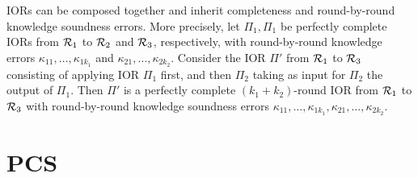 \documentclass[11pt,letterpaper,usenames,dvipsnames]{article}
\begin{document}
\begin{remark}\label{r:ior_compositoin}
 IORs can be composed together and inherit completeness and round-by-round knowledge soundness errors. More precisely, let $\Pi_1,\Pi_1$ be perfectly complete IORs from $\mathcal{R}_1$ to $\mathcal{R}_2$  and $\mathcal{R}_3$, respectively, with round-by-round knowledge errors $\kappa_{11},\ldots, \kappa_{1k_1}$ and $\kappa_{21}, \ldots, \kappa_{2k_2}$. Consider  the IOR $\Pi'$ from $\mathcal{R}_1$ to $\mathcal{R}_3$ consisting of applying IOR $\Pi_1$ first, and then $\Pi_2$ taking as input for $\Pi_2$ the output of $\Pi_1$.   Then $\Pi'$ is a perfectly complete $(k_1+k_2)$-round IOR from $\mathcal{R}_1$ to $\mathcal{R}_3$ with round-by-round knowledge soundness errors $\kappa_{11},\ldots, \kappa_{1k_1}, \kappa_{21}, \ldots, \kappa_{2k_2}$.

\end{remark}

\section{\ftwoz PCS}



\end{document}
